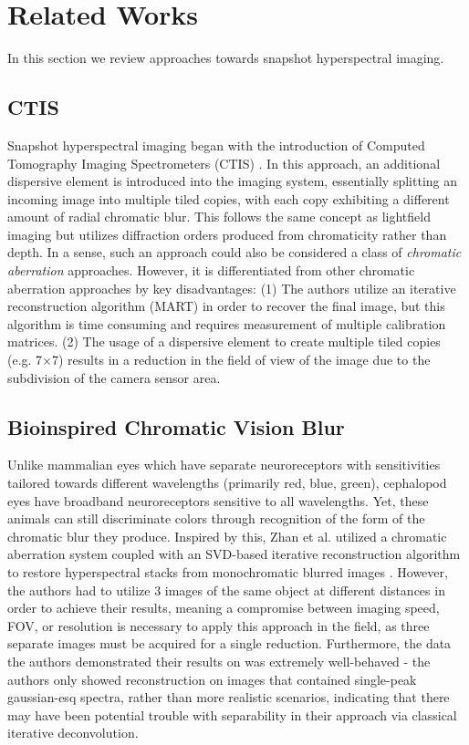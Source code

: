 \documentclass{article}
\begin{document}
\section{Related Works}
In this section we review approaches towards snapshot hyperspectral imaging.

\subsection{CTIS}
Snapshot hyperspectral imaging began with the introduction of Computed Tomography Imaging Spectrometers (CTIS) \cite{FORD2001986}. In this approach, an additional dispersive element is introduced into the imaging system, essentially splitting an incoming image into multiple tiled copies, with each copy exhibiting a different amount of radial chromatic blur. This follows the same concept as lightfield imaging \cite{guo2019fourier}\cite{broxton2013wave} but utilizes diffraction orders produced from chromaticity rather than depth. In a sense, such an approach could also be considered a class of \textit{chromatic aberration} approaches. However, it is differentiated from other chromatic aberration approaches by key disadvantages: (1) The authors utilize an iterative reconstruction algorithm (MART) in order to recover the final image, but this algorithm is time consuming and requires measurement of multiple calibration matrices. (2) The usage of a dispersive element to create multiple tiled copies (e.g. 7×7) results in a reduction in the field of view of the image due to the subdivision of the camera sensor area.

\subsection{Bioinspired Chromatic Vision Blur}
Unlike mammalian eyes which have separate neuroreceptors with sensitivities tailored towards different wavelengths (primarily red, blue, green), cephalopod eyes have broadband neuroreceptors sensitive to all wavelengths. Yet, these animals can still discriminate colors through recognition of the form of the chromatic blur they produce. Inspired by this, Zhan et al. utilized a chromatic aberration system coupled with an SVD-based iterative reconstruction algorithm to restore hyperspectral stacks from monochromatic blurred images \cite{zhan2019hyperspectral}. However, the authors had to utilize 3 images of the same object at different distances in order to achieve their results, meaning a compromise between imaging speed, FOV, or resolution is necessary to apply this approach in the field, as three separate images must be acquired for a single reduction. Furthermore, the data the authors demonstrated their results on was extremely well-behaved - the authors only showed reconstruction on images that contained single-peak gaussian-esq spectra, rather than more realistic scenarios, indicating that there may have been potential trouble with separability in their approach via classical iterative deconvolution.
\end{document}
